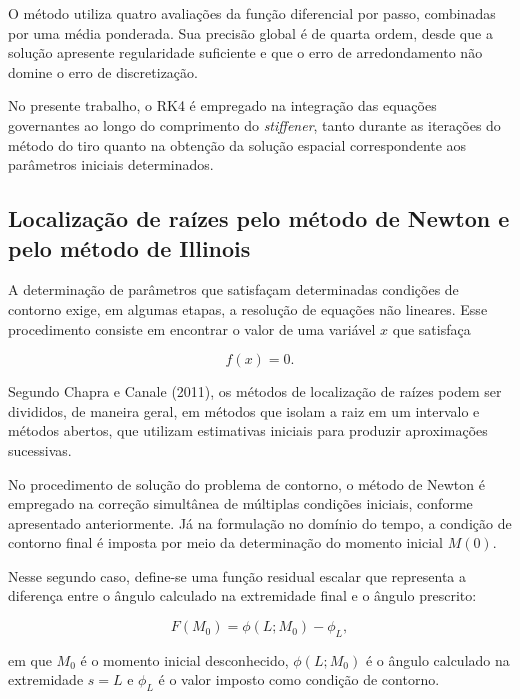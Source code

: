 \documentclass[arial,centeredequations,english,brazilian,oneside,section=TITLE]{ifes8}
\begin{document}
O método utiliza quatro avaliações da função diferencial por
passo, combinadas por uma média ponderada. Sua precisão global é
de quarta ordem, desde que a solução apresente regularidade
suficiente e que o erro de arredondamento não domine o erro de
discretização.

No presente trabalho, o RK4 é empregado na integração das equações
governantes ao longo do comprimento do \textit{stiffener}, tanto
durante as iterações do método do tiro quanto na obtenção da
solução espacial correspondente aos parâmetros iniciais
determinados.

\subsection{Localização de raízes pelo método de Newton e pelo
método de Illinois}
\label{subsec:busca-raizes}

A determinação de parâmetros que satisfaçam determinadas condições
de contorno exige, em algumas etapas, a resolução de equações não
lineares. Esse procedimento consiste em encontrar o valor de uma
variável $x$ que satisfaça

\begin{equation}
  f(x)=0.
  \label{eq:equacao-raiz}
\end{equation}

Segundo Chapra e Canale (2011), os métodos de localização de raízes
podem ser divididos, de maneira geral, em métodos que isolam a raiz
em um intervalo e métodos abertos, que utilizam estimativas
iniciais para produzir aproximações sucessivas.

No procedimento de solução do problema de contorno, o método de
Newton é empregado na correção simultânea de múltiplas condições
iniciais, conforme apresentado anteriormente. Já na formulação
no domínio do tempo, a condição de contorno final é imposta por
meio da determinação do momento inicial $M(0)$.

Nesse segundo caso, define-se uma função residual escalar que
representa a diferença entre o ângulo calculado na extremidade
final e o ângulo prescrito:

\begin{equation}
  F(M_0)=\phi(L;M_0)-\phi_L,
  \label{eq:residuo-momento}
\end{equation}

em que $M_0$ é o momento inicial desconhecido, $\phi(L;M_0)$ é
o ângulo calculado na extremidade $s=L$ e $\phi_L$ é o valor
imposto como condição de contorno.
\end{document}
